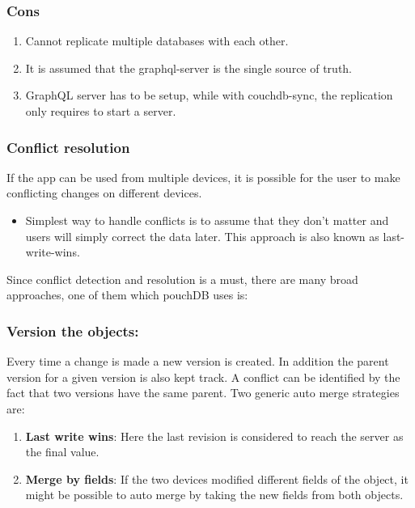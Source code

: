 \subsubsection*{Cons}
\begin{enumerate}
    \item Cannot replicate multiple databases with each other.
    \item It is assumed that the graphql-server is the single source of truth.
    \item GraphQL server has to be setup, while with couchdb-sync, the replication 
    only requires to start a server.~\cite{RxDBreplication}
\end{enumerate}


\subsubsection{Conflict resolution}
If the app can be used from multiple devices, it is possible for the user to make 
conflicting changes on different devices.

\begin{itemize}
    \item Simplest way to handle conflicts is to assume that they don’t matter and 
    users will simply correct the data later. This approach is also known as last-write-wins.
\end{itemize}

Since conflict detection and resolution is a must, there are many broad approaches, 
one of them which pouchDB uses is:

\subsubsection*{Version the objects:}

Every time a change is made a new version is created. In addition the parent version for a given 
version is also kept track. A conflict can be identified by the fact that two versions have the 
same parent. Two generic auto merge strategies are:

\begin{enumerate}
    \item \textbf{Last write wins}: Here the last revision is considered to 
    reach the server as the final value.
    \item \textbf{Merge by fields}: If the two devices modified different fields 
    of the object, it might be possible to auto merge by taking the new fields from both objects.
\end{enumerate}

